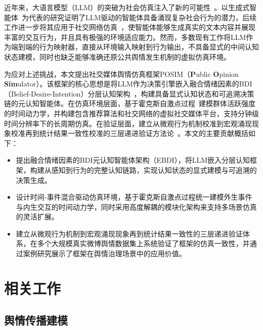 \documentclass[a4paper,fleqn]{cas-sc}
\begin{document}
近年来，大语言模型（LLM）的突破为社会仿真注入了新的可能性~\citep{wang_survey_2024}。以生成式智能体~\citep{park_generative_2023}为代表的研究证明了LLM驱动的智能体具备涌现复杂社会行为的潜力，后续工作进一步将其应用于社交网络仿真~\citep{gao_s3_2023,chuang_simulating_2024}，使智能体能够生成真实的文本内容并展现丰富的交互行为，并且具有极强的环境适应能力。然而，多数现有工作将LLM作为端到端的行为映射器，直接从环境输入映射到行为输出，不具备显式的中间认知状态建模，同时也缺乏能够准确还原公共舆情发生机制的虚拟仿真环境。

为应对上述挑战，本文提出社交媒体舆情仿真框架POSIM（\textbf{P}ublic \textbf{O}pinion \textbf{Sim}ulator）。该框架的核心思想是将LLM作为决策引擎嵌入融合情绪因素的BDI（Belief-Desire-Intention）分层认知架构~\citep{bratman_intention_1987,rao_bdi_1995}，构建具备显式认知状态和可追溯决策链的元认知智能体。在仿真环境层面，基于霍克斯自激点过程~\citep{hawkes_spectra_1971}建模群体活跃强度的时间动力学，并构建包含推荐算法和社交网络的虚拟社交媒体平台，支持分钟级时间分辨率下的长周期仿真。在验证层面，建立从微观行为机制校准到宏观涌现现象校准再到统计结果一致性校准的三层递进验证方法论~\citep{sargent_verification_2013}。本文的主要贡献概括如下：

\begin{itemize}
\item 提出融合情绪因素的BDI元认知智能体架构（EBDI），将LLM嵌入分层认知框架，构建从感知到行为的完整认知链路，实现认知状态的显式建模与可追溯的决策生成。
\item 设计时间-事件混合驱动仿真环境，基于霍克斯自激点过程统一建模外生事件与内生交互的时间动力学，同时采用高度解耦的模块化架构来支持多场景仿真的灵活扩展。
\item 建立从微观行为机制到宏观涌现现象再到统计结果一致性的三层递进验证体系，在多个大规模真实微博舆情数据集上系统验证了框架的仿真一致性，并通过案例研究展示了框架在舆情治理场景中的应用价值。
\end{itemize}

\section{相关工作}\label{sec:related}

\subsection{舆情传播建模}
\end{document}
